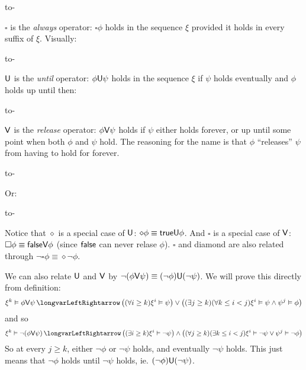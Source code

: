         \medskip
        \moveright\leftskip\hbox to\dimexpr\hsize-\leftskip\relax{\rlap{\kern\dimexpr\sqwd * 10\relax\tosq{$\phi$}}\leaders\sq\hfill\null}
    \item $\square$ is the {\it always} operator: $\square\phi$ holds in the sequence $\xi$ provided it holds in every suffix of $\xi$.
        Visually:

        \medskip
        \moveright\leftskip\hbox to\dimexpr\hsize-\leftskip\relax{\leaders\tosq{$\phi$}\hfill\kern-\dimexpr\hsize-\leftskip\relax\leaders\sq\hfill\null}
    \item ${\sf U}$ is the {\it until} operator: $\phi{\sf U}\psi$ holds in the sequence $\xi$ if $\psi$ holds eventually and $\phi$ holds up until then:

        \medskip
        \moveright\leftskip\hbox to\dimexpr\hsize-\leftskip\relax{\leaders\tosq{$\phi$}\hskip\dimexpr\sqwd * 20\relax\tosq{$\psi$}\kern-\dimexpr\sqwd * 21\relax\leaders\sq\hfill\null}
    \item ${\sf V}$ is the {\it release} operator: $\phi{\sf V}\psi$ holds if $\psi$ either holds forever, or up until some point when both $\phi$ and $\psi$ hold.
        The reasoning for the name is that $\phi$ ``releases'' $\psi$ from having to hold for forever.

        \medskip
        \moveright\leftskip\hbox to\dimexpr\hsize-\leftskip\relax{\leaders\tosq{$\psi$}\hfill\kern-\dimexpr\hsize-\leftskip\relax\leaders\sq\hfill\null}
        \medskip

        \centerline{Or:}
        \medskip
        \moveright\leftskip\hbox to\dimexpr\hsize-\leftskip\relax{%
            \def\sqht{1cm}\leaders\tosq{$\psi$}\hskip\dimexpr\sqwd * 20\relax\tosq{$\stackmath{\psi\cr\noalign{\kern.2cm}\phi}$}\kern-\dimexpr\sqwd * 21\relax\leaders\sq\hfill\null}
\eenum

Notice that $\diamond$ is a special case of ${\sf U}$: $\diamond\phi\equiv{\sf true}{\sf U}\phi$.
And $\square$ is a special case of ${\sf V}$: $\square\phi\equiv{\sf false}{\sf V}\phi$ (since ${\sf false}$ can never relase $\phi$).
$\square$ and diamond are also related through $\neg\square\phi\equiv\diamond\neg\phi$.

We can also relate ${\sf U}$ and ${\sf V}$ by $\neg(\phi{\sf V}\psi)\equiv(\neg\phi){\sf U}(\neg\psi)$.
We will prove this directly from definition:
$$ \xi^k\vDash\phi\V\psi \iff \bigl((\forall i\geq k)\xi^i\vDash\psi\bigr)\lor\bigl((\exists j\geq k)(\forall k\leq i<j)\xi^i\vDash\psi\land\psi^j\vDash\phi\bigr) $$
and so
$$ \xi^k\vDash\neg(\phi\V\psi) \iff \bigl((\exists i\geq k)\xi^i\vDash\neg\psi\bigr)\land\bigl((\forall j\geq k)(\exists k\leq i<j)\xi^i\vDash\neg\psi\lor\psi^j\vDash\neg\phi\bigr) $$
So at every $j\geq k$, either $\neg\phi$ or $\neg\psi$ holds, and eventually $\neg\psi$ holds.
This just means that $\neg\phi$ holds until $\neg\psi$ holds, ie. $(\neg\phi){\sf U}(\neg\psi)$.

